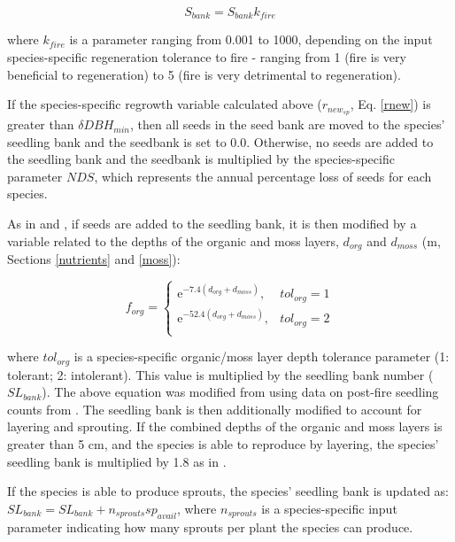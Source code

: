 \documentclass[a4paper, 12pt] {report}
\begin{document}
\begin{equation} 
S_{bank} = S_{bank}k_{fire}
\end{equation}

where $k_{fire}$ is a parameter ranging from 0.001 to 1000, depending on the input species-specific regeneration tolerance to fire - ranging from 1 (fire is very beneficial to regeneration) to 5 (fire is very detrimental to regeneration).

If the species-specific regrowth variable calculated above ($r_{new_{sp}}$, Eq. \ref{rnew}) is greater than $\delta DBH_{min}$, then all seeds in the seed bank are moved to the species' seedling bank and the seedbank is set to 0.0. Otherwise, no seeds are added to the seedling bank and the seedbank is multiplied by the species-specific parameter $NDS$, which represents the annual percentage loss of seeds for each species. 

As in  and , if seeds are added to the seedling bank, it is then modified by a variable related to the depths of the organic and moss layers, $d_{org}$ and $d_{moss}$ (m, Sections \ref{nutrients} and \ref{moss}):

\begin{equation} \label{forg}
f_{org} = \begin{cases}
\text{e}^{-7.4(d_{org} + d_{moss})}, & \text{$tol_{org} = 1$} \\
\text{e}^{-52.4(d_{org} + d_{moss})}, & \text{$tol_{org} = 2$} \\
\end{cases}
\end{equation}

where $tol_{org}$ is a species-specific organic/moss layer depth tolerance parameter (1: tolerant; 2: intolerant). This value is multiplied by the seedling bank number ($SL_{bank}$). The above equation was modified from  using data on post-fire seedling counts from .  The seedling bank is then additionally modified to account for layering and sprouting. If the combined depths of the organic and moss layers is greater than 5 cm, and the species is able to reproduce by layering, the species' seedling bank is multiplied by 1.8 as in  . 

If the species is able to produce sprouts, the species' seedling bank is updated as: $SL_{bank} = SL_{bank} + n_{sprouts}sp_{avail}$, where $n_{sprouts}$ is a species-specific input parameter indicating how many sprouts per plant the species can produce.
\end{document}
